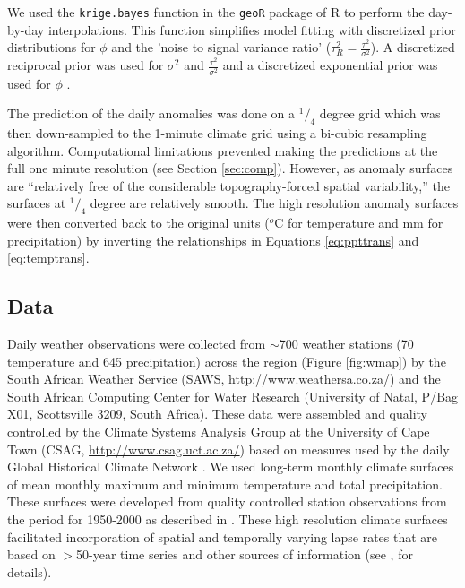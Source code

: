 \documentclass[12pt]{article}
\begin{document}
We used the \texttt{krige.bayes} function in the \texttt{geoR} package
\citep{diggle_geor:_2001} of R \citep[][v2.12.1]{r_development_core_team_r:_2011}
to perform the day-by-day interpolations.  
This function simplifies model fitting with
discretized prior distributions for $\phi$ and the 'noise to signal
variance ratio' ($\tau^2_R=\frac{\tau^2}{\sigma^2}$).  
A discretized reciprocal
prior was used for $\sigma^2$ and $\frac{\tau^2}{\sigma^2}$ and a discretized  exponential
prior was used for $\phi$ \citep[see ][for a discussion of various choices for
these parameters]{diggle_bayesian_2002}.

The prediction of the daily anomalies was done on a $^1/_4$ degree
grid which was then down-sampled to the 1-minute climate grid using a
bi-cubic resampling algorithm. Computational limitations prevented making the
predictions at the full one minute resolution (see Section
\ref{sec:comp}).  However, as anomaly surfaces are ``relatively free of the
considerable topography-forced spatial variability,''
\citep{willmott_climatologically_1995} the surfaces at $^1/_4$
degree are relatively smooth.  The high resolution
anomaly surfaces were then converted back to the original units ($^o$C
for temperature and mm for precipitation) by inverting the relationships in Equations \ref{eq:ppttrans} and \ref{eq:temptrans}.

\subsection{Data}
Daily weather observations were collected from $\sim$700 weather
stations (70 temperature and 645 precipitation) across the region
(Figure \ref{fig:wmap}) by the South African Weather
Service (SAWS, \url{http://www.weathersa.co.za/}) and the South
African Computing Center for Water Research (University of Natal, P/Bag X01, Scottsville 3209, South Africa). 
These data were assembled and quality controlled by the Climate Systems Analysis
Group at the University of Cape Town (CSAG,
\url{http://www.csag.uct.ac.za/}) based on measures used by the daily
Global Historical Climate Network \citep{williams_united_2006}.  
We used long-term monthly climate surfaces of mean monthly maximum and minimum
temperature and total precipitation.  
These surfaces were developed from quality controlled station
observations from the period for 1950-2000 as
described in \cite{schulze_south_2007}.  
These  high resolution climate surfaces facilitated incorporation of spatial and
temporally varying lapse rates that are based on $>$50-year time series
and other sources of information (see \citealp{schulze_south_2007}, for
details).  
\end{document}
